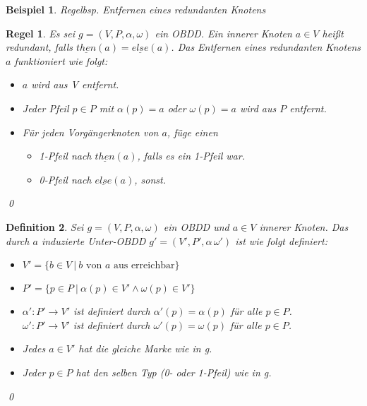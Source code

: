 \documentclass[ngerman]{scrartcl}
\theoremstyle{custom}
\newtheorem{mdef}{Definition} \numberwithin{mdef}{subsection}
\newtheorem{mr}[mdef]{Regel}
\newtheorem*{ex}{Beispiel}
\newcommand{\0}{\mathbf{0}}
\newcommand{\1}{\mathbf{L}}
\begin{document}
\begin{ex}
Regelbsp. Entfernen eines redundanten Knotens
\end{ex}

\begin{mr}\label{regel:entf}
Es sei $g=(V,P,\alpha,\omega)$ ein OBDD. Ein innerer Knoten $a \in V$
hei\ss t redundant, falls $\underline{then}(a) = \underline{else}(a)$.
Das Entfernen eines redundanten Knotens $a$ funktioniert wie folgt:
\begin{itemize}
\item[(1)] $a$ wird aus V entfernt.
\item[(2)] Jeder Pfeil $p \in P$ mit $\alpha(p) = a$ oder $\omega(p) =
  a$ wird aus $P$ entfernt.
\item[(3)] F\"ur jeden Vorg\"angerknoten von $a$, f\"uge einen
  \begin{itemize}
  \item[(i)] 1-Pfeil nach $\underline{then}(a)$, falls es ein 1-Pfeil
    war.
  \item[(ii)] 0-Pfeil nach $\underline{else}(a)$, sonst.
  \end{itemize}
\end{itemize}
\qed
\end{mr}

\begin{mdef}
Sei $g=(V,P,\alpha,\omega)$ ein OBDD und $a \in V$ innerer Knoten. Das
durch $a$ induzierte Unter-OBDD $g'=(V',P',\alpha\,\omega')$ ist wie
folgt definiert:
\begin{itemize}
\item[(1)] $V' = \{b \in V ~\vert~ b \text{ von } a \text{ aus erreichbar}\}$
\item[(2)] $P' = \{p \in P ~\vert~ \alpha(p) \in V' \wedge \omega(p) \in
  V'\} $
\item[(3)] $\alpha' : P' \rightarrow V'$ ist definiert durch $\alpha'(p) =
  \alpha(p)$ f\"ur alle $p \in P$.\\
  $\omega' : P' \rightarrow V'$ ist definiert durch $\omega'(p) =
  \omega(p)$ f\"ur alle $p \in P$.
\item[(4)] Jedes $a \in V'$ hat die gleiche Marke wie in g.
\item[(5)] Jeder $p \in P$ hat den selben Typ (0- oder 1-Pfeil) wie in g.
\end{itemize}
\qed
\end{mdef}
\end{document}
